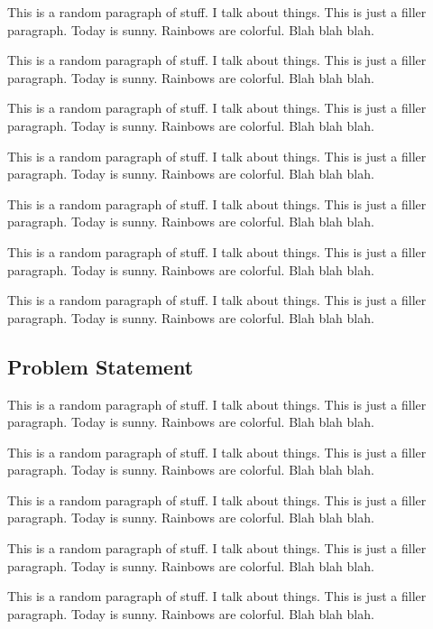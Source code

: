 \documentclass{article}
\begin{document}
		{\color{BurntOrange} This is a random paragraph of stuff. I talk about things. This is just a filler paragraph. Today is sunny. Rainbows are colorful. Blah blah blah.}
		
		{\color{BurntOrange} This is a random paragraph of stuff. I talk about things. This is just a filler paragraph. Today is sunny. Rainbows are colorful. Blah blah blah.}
		
		{\color{BurntOrange} This is a random paragraph of stuff. I talk about things. This is just a filler paragraph. Today is sunny. Rainbows are colorful. Blah blah blah.}
		
		{\color{BurntOrange} This is a random paragraph of stuff. I talk about things. This is just a filler paragraph. Today is sunny. Rainbows are colorful. Blah blah blah.}
		
		{\color{BurntOrange} This is a random paragraph of stuff. I talk about things. This is just a filler paragraph. Today is sunny. Rainbows are colorful. Blah blah blah.}
		
		{\color{BurntOrange} This is a random paragraph of stuff. I talk about things. This is just a filler paragraph. Today is sunny. Rainbows are colorful. Blah blah blah.}
		
		{\color{BurntOrange} This is a random paragraph of stuff. I talk about things. This is just a filler paragraph. Today is sunny. Rainbows are colorful. Blah blah blah.}
		
	\subsection{Problem Statement}

		{\color{BurntOrange} This is a random paragraph of stuff. I talk about things. This is just a filler paragraph. Today is sunny. Rainbows are colorful. Blah blah blah.}
		
		{\color{BurntOrange} This is a random paragraph of stuff. I talk about things. This is just a filler paragraph. Today is sunny. Rainbows are colorful. Blah blah blah.}
		
		{\color{BurntOrange} This is a random paragraph of stuff. I talk about things. This is just a filler paragraph. Today is sunny. Rainbows are colorful. Blah blah blah.}
		
		{\color{BurntOrange} This is a random paragraph of stuff. I talk about things. This is just a filler paragraph. Today is sunny. Rainbows are colorful. Blah blah blah.}
		
		{\color{BurntOrange} This is a random paragraph of stuff. I talk about things. This is just a filler paragraph. Today is sunny. Rainbows are colorful. Blah blah blah.}
			
\end{document}
